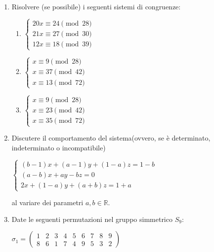 \documentclass[fleqn]{article}
\begin{document}
\begin{enumerate}
   \item Risolvere (se possibile) i seguenti sistemi di congruenze:
   
   \begin{enumerate} 
      \item \begin{center} 
      $ \begin{cases}
         20x \equiv 24 \pmod{28} \\
         21x \equiv 27 \pmod{30} \\
         12x \equiv 18 \pmod{39} 
      \end{cases} $
      \end{center}
      \item \begin{center} 
      $ \begin{cases}
         x \equiv 9 \pmod{28} \\
         x \equiv 37 \pmod{42} \\
         x \equiv 13 \pmod{72} 
      \end{cases} $
      \end{center}
      \item \begin{center}
      $ \begin{cases}
         x \equiv 9 \pmod{28} \\
         x \equiv 23 \pmod{42} \\
         x \equiv 35 \pmod{72} 
      \end{cases} $
      \end{center}
   \end{enumerate}

   \item Discutere il comportamento del sistema(ovvero, se è determinato, indeterminato o incompatibile)
   \begin{center}
   $\begin{cases} 
      (b-1)x + (a-1)y + (1-a)z = 1-b\\
      (a-b)x + ay - bz = 0 \\
      2x + (1-a)y + (a+b)z = 1 + a
   \end{cases}$ \\
   \end{center}
   al variare dei parametri $a,b \in \mathbb{R}$.

   \item Date le seguenti permutazioni nel gruppo simmetrico $S_9$:
   \begin{center}
      $ \sigma_{1} = \begin{pmatrix}
         1 & 2 & 3 & 4 & 5 & 6 & 7 & 8 & 9 \\
         8 & 6 & 1 & 7 & 4 & 9 & 5 & 3 & 2
      \end{pmatrix} $


\end{center}
\end{enumerate}
\end{document}
